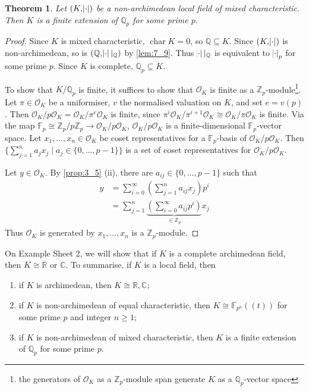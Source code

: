 \documentclass[11pt]{article}
\theoremstyle{definition}
\theoremstyle{plain}
\newtheorem{theorem}[definition]{Theorem}
\theoremstyle{remark}
\DeclareMathOperator{\Char}{char}
\newcommand{\FF}{\mathbb{F}}
\newcommand{\ZZ}{\mathbb{Z}}
\newcommand{\QQ}{\mathbb{Q}}
\newcommand{\RR}{\mathbb{R}}
\newcommand{\CC}{\mathbb{C}}
\newcommand{\cO}{\mathcal{O}}
\begin{document}
\begin{theorem}\label{thm:7_11}
    Let $(K, \abs{\cdot})$ be a non-archimedean local field of mixed characteristic. Then $K$ is a finite extension of $\QQ_p$ for some prime $p$.
\end{theorem}
\begin{proof}
    Since $K$ is mixed characteristic, $\Char{K} = 0$, so $\QQ \subseteq K$. Since $(K, \abs{\cdot})$ is non-archimedean, so is $(\QQ, \abs{\cdot} \vert_\QQ)$ by \autoref{lem:7_9}. Thus $\abs{\cdot} \vert_\QQ$ is equivalent to $\abs{\cdot}_p$ for some prime $p$. Since $K$ is complete, $\QQ_p \subseteq K$.

    To show that $K / \QQ_p$ is finite, it suffices to show that $\cO_K$ is finite as a $\ZZ_p$-module\footnote{the generators of $\cO_K$ as a $\ZZ_p$-module span generate $K$ as a $\QQ_p$-vector space}. Let $\pi \in \cO_K$ be a uniformiser, $v$ the normalised valuation on $K$, and set $e = v(p)$. Then $\cO_K / p \cO_K = \cO_K / \pi^e \cO_K$ is finite, since $\pi^i \cO_K / \pi^{i+1} \cO_K \cong \cO_K / \pi \cO_K$ is finite. Via the map $\FF_p \cong \ZZ_p / p \ZZ_p \to \cO_K / p \cO_K$, $\cO_K / p \cO_K$ is a finite-dimensional $\FF_p$-vector space. Let $x_1, \ldots, x_n \in \cO_K$ be coset representatives for a $\FF_p$-basis of $\cO_K / p \cO_K$. Then $\{\sum_{j=1}^n a_j x_j \mid a_j \in \{0, \ldots, p-1\}\}$ is a set of coset representatives for $\cO_K / p \cO_K$.

    Let $y \in \cO_K$. By \autoref{prop:3_5} (ii), there are $a_{ij} \in \{0, \ldots, p-1\}$ such that
    \begin{align*}
        y
        &= \sum_{i=0}^\infty \left(\sum_{j=1}^n a_{ij} x_j\right) p^i\\
        &= \sum_{j=1}^n \underbrace{\left(\sum_{i=0}^\infty a_{ij} p^i\right)}_{\in \ZZ_p} x_j
    \end{align*}
    Thus $\cO_K$ is generated by $x_1, \ldots, x_n$ is a $\ZZ_p$-module.
\end{proof}

On Example Sheet 2, we will show that if $K$ is a complete archimedean field, then $K \cong \RR$ or $\CC$. To summarise, if $K$ is a local field, then
\begin{enumerate}
    \item if $K$ is archimedean, then $K \cong \RR, \CC$;
    \item if $K$ is non-archimedean of equal characteristic, then $K \cong \FF_{p^n}((t))$ for some prime $p$ and integer $n \ge 1$;
    \item if $K$ is non-archimedean of mixed characteristic, then $K$ is a finite extension of $\QQ_p$ for some prime $p$.
\end{enumerate}
\end{document}
